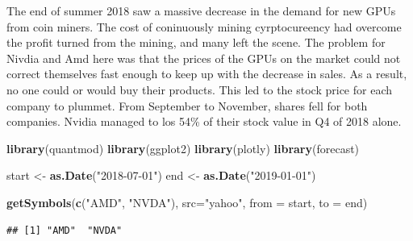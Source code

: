 \documentclass[]{article}
\newenvironment{Shaded}{\begin{snugshade}}{\end{snugshade}}
\newcommand{\DataTypeTok}[1]{\textcolor[rgb]{0.13,0.29,0.53}{#1}}
\newcommand{\KeywordTok}[1]{\textcolor[rgb]{0.13,0.29,0.53}{\textbf{#1}}}
\newcommand{\NormalTok}[1]{#1}
\newcommand{\StringTok}[1]{\textcolor[rgb]{0.31,0.60,0.02}{#1}}
\begin{document}
The end of summer 2018 saw a massive decrease in the demand for new GPUs
from coin miners. The cost of coninuously mining cyrptocureency had
overcome the profit turned from the mining, and many left the scene. The
problem for Nivdia and Amd here was that the prices of the GPUs on the
market could not correct themselves fast enough to keep up with the
decrease in sales. As a result, no one could or would buy their
products. This led to the stock price for each company to plummet. From
September to November, shares fell for both companies. Nvidia managed to
los 54\% of their stock value in Q4 of 2018 alone.

\begin{Shaded}
\begin{Highlighting}[]
\KeywordTok{library}\NormalTok{(quantmod)}
\KeywordTok{library}\NormalTok{(ggplot2)}
\KeywordTok{library}\NormalTok{(plotly)}
\KeywordTok{library}\NormalTok{(forecast)}
\end{Highlighting}
\end{Shaded}

\begin{Shaded}
\begin{Highlighting}[]
\NormalTok{start <-}\StringTok{ }\KeywordTok{as.Date}\NormalTok{(}\StringTok{"2018-07-01"}\NormalTok{)}
\NormalTok{end <-}\StringTok{ }\KeywordTok{as.Date}\NormalTok{(}\StringTok{"2019-01-01"}\NormalTok{)}

\KeywordTok{getSymbols}\NormalTok{(}\KeywordTok{c}\NormalTok{(}\StringTok{"AMD"}\NormalTok{, }\StringTok{"NVDA"}\NormalTok{), }\DataTypeTok{src=}\StringTok{"yahoo"}\NormalTok{, }\DataTypeTok{from =}\NormalTok{ start, }\DataTypeTok{to =}\NormalTok{ end)}
\end{Highlighting}
\end{Shaded}

\begin{verbatim}
## [1] "AMD"  "NVDA"
\end{verbatim}
\end{document}
